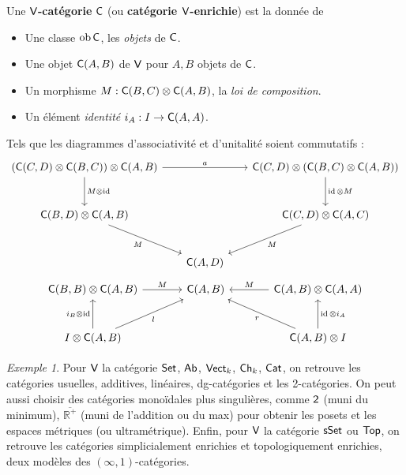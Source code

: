 \documentclass[8pt,a4paper,french,draft]{article}
\newcommand{\bb}[1]{\mathbb{#1}}
\newcommand{\cat}[1]{\textcat{#1}}
\newcommand{\textcat}[1]{{\normalfont\textsf{#1}}}
\DeclareMathOperator{\id}{id}
\DeclareMathOperator{\ob}{ob}
\theoremstyle{plain}
\theoremstyle{definition}
\theoremstyle{remark}
\newtheorem{example}[theorem]{Exemple}
\begin{document}
\begin{definition}\index{catégorie $\cat{V}$-enrichie}
    Une \textbf{$\cat{V}$-catégorie} $\cat{C}$ (ou \textbf{catégorie $\cat{V}$-enrichie}) est la donnée de
    \begin{itemize}
        \item Une classe $\ob\cat{C}$, les \textit{objets} de $\cat{C}$.
        \item Une objet $\cat{C}(A, B)$ de $\cat{V}$ pour $A, B$ objets de $\cat{C}$.
        \item Un morphisme $M : \cat{C}(B, C) \otimes \cat{C}(A, B)$, la \textit{loi de composition}.
        \item Un élément \textit{identité} $i_A : I \to \cat{C}(A, A)$.
    \end{itemize}
    Tels que les diagrammes d'associativité et d'unitalité soient commutatifs :
    \[\begin{tikzcd}[sep=scriptsize]
        {(\cat{C}(C, D) \otimes \cat{C}(B, C)) \otimes \cat{C}(A, B)} && {\cat{C}(C, D) \otimes (\cat{C}(B, C) \otimes \cat{C}(A, B))} \\
        \\
        {\cat{C}(B, D)\otimes \cat{C}(A, B)} && {\cat{C}(C, D) \otimes \cat{C}(A, C)} \\
        \\
        & {\cat{C}(A, D)}
        \arrow["a", from=1-1, to=1-3]
        \arrow["{M\otimes \id}", from=1-1, to=3-1]
        \arrow["{\id \otimes M}", from=1-3, to=3-3]
        \arrow["M"', from=3-1, to=5-2]
        \arrow["M", from=3-3, to=5-2]
    \end{tikzcd}\]
    \[\begin{tikzcd}[sep=scriptsize]
        {\cat{C}(B, B) \otimes \cat{C}(A, B)} && {\cat{C}(A, B)} && {\cat{C}(A, B) \otimes \cat{C}(A, A)} \\
        \\
        {I \otimes \cat{C}(A, B)} &&&& {\cat{C}(A, B) \otimes I}
        \arrow["M", from=1-1, to=1-3]
        \arrow["M"', from=1-5, to=1-3]
        \arrow["{i_B \otimes \id}", from=3-1, to=1-1]
        \arrow["l"', from=3-1, to=1-3]
        \arrow["r", from=3-5, to=1-3]
        \arrow["{\id \otimes i_A}"', from=3-5, to=1-5]
    \end{tikzcd}\]
\end{definition}

\begin{example}
    Pour $\cat{V}$ la catégorie $\cat{Set}$, $\cat{Ab}$, $\cat{Vect}_k$, $\cat{Ch}_k$, $\cat{Cat}$, on retrouve les catégories usuelles, additives, linéaires, dg-catégories et les 2-catégories. On peut aussi choisir des catégories monoïdales plus singulières, comme $\cat{2}$ (muni du minimum), $\overline{\bb{R}^+}$ (muni de l'addition ou du max) pour obtenir les posets et les espaces métriques (ou ultramétrique). Enfin, pour $\cat{V}$ la catégorie $\cat{sSet}$ ou $\cat{Top}$, on retrouve les catégories simplicialement enrichies et topologiquement enrichies, deux modèles des $(\infty, 1)$-catégories.
\end{example}
\end{document}
